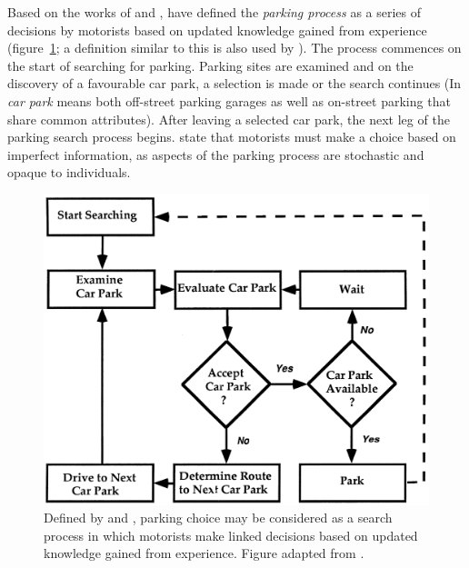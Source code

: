 Based on the works of  and ,  have defined the \textit{parking process} as a series of decisions by motorists based on updated knowledge gained from experience (figure~\ref{fig:parking-process-thompson}; a definition similar to this is also used by ). The process commences on the start of searching for parking. Parking sites are examined and on the discovery of a favourable car park, a selection is made or the search continues (In  \textit{car park} means both off-street parking garages as well as on-street parking that share common attributes). After leaving a selected car park, the next leg of the parking search process begins. \citeauthor{Thompson1998} state that motorists must make a choice based on imperfect information, as aspects of the parking process are stochastic and opaque to individuals.

\begin{figure}[H]%
    \centering
    \includegraphics[width=.75\textwidth]{images/thesis_parking_search_process_thompson1998.PNG}
    \caption[Parking search process]{Defined by  and , parking choice may be considered as a search process in which motorists make linked decisions based on updated knowledge gained from experience. Figure adapted from \cite[pp.~160]{Thompson1998}.}%
    \label{fig:parking-process-thompson}%
\end{figure}

